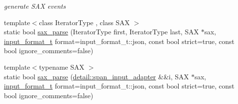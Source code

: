 \begin{DoxyCompactItemize}
\begin{DoxyCompactList}\small\item\em generate S\+AX events \end{DoxyCompactList}\item 
{\footnotesize template$<$class Iterator\+Type , class S\+AX $>$ }\\static bool \hyperlink{classnlohmann_1_1basic__json_ab62241c2694a054818edf2f66d72f113}{sax\+\_\+parse} (Iterator\+Type first, Iterator\+Type last, S\+AX $\ast$sax, \hyperlink{namespacenlohmann_1_1detail_aa554fc6a11519e4f347deb25a9f0db40}{input\+\_\+format\+\_\+t} format=input\+\_\+format\+\_\+t\+::json, const bool strict=true, const bool ignore\+\_\+comments=false)
\item 
{\footnotesize template$<$typename S\+AX $>$ }\\static bool \hyperlink{classnlohmann_1_1basic__json_aef9ef0a817ecde8bf270653e8706c150}{sax\+\_\+parse} (\hyperlink{classnlohmann_1_1detail_1_1span__input__adapter}{detail\+::span\+\_\+input\+\_\+adapter} \&\&i, S\+AX $\ast$sax, \hyperlink{namespacenlohmann_1_1detail_aa554fc6a11519e4f347deb25a9f0db40}{input\+\_\+format\+\_\+t} format=input\+\_\+format\+\_\+t\+::json, const bool strict=true, const bool ignore\+\_\+comments=false)
\end{DoxyCompactItemize}
